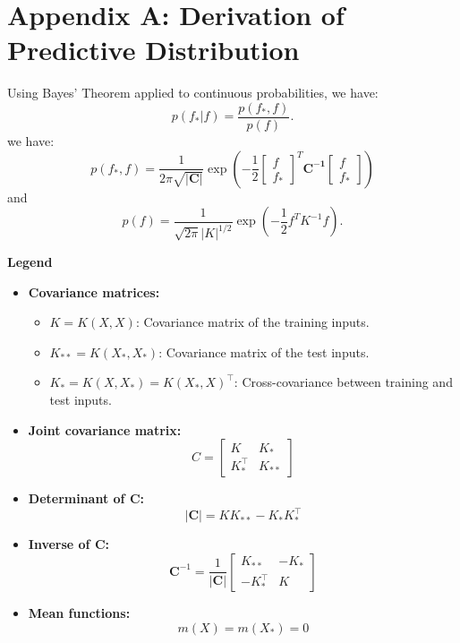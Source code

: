 \documentclass[12pt]{article}
\begin{document}
\appendix

\section{Appendix A: Derivation of Predictive Distribution}
\label{appendix:A}
Using Bayes' Theorem applied to continuous probabilities, we have:
\[
p(f_* | f) = \frac{p(f_*, f)}{p(f)}.
\]
we have:
$$p(f_*,f) = \frac{1}{2\pi\sqrt{\mathbf{|C|}}}\exp \left(-\frac{1}{2} 
\begin{bmatrix} f \\ f_*  \end{bmatrix}^T\mathbf{C^{-1}}\begin{bmatrix} f  \\ f_* \end{bmatrix}\right)$$
and 
\[
p(f) = \frac{1}{\sqrt{2\pi} |K|^{1/2}}
\exp \left(-\frac{1}{2} f^T K^{-1} f \right).
\]

\noindent
\textbf{Legend}
\begin{itemize}
    \item \textbf{Covariance matrices:}
    \begin{itemize}
        \item \( K = K(X, X) \): Covariance matrix of the training inputs.
        \item \( K_{**} = K(X_*, X_*) \): Covariance matrix of the test inputs.
        \item \( K_* = K(X, X_*) = K(X_*, X)^\top \): Cross-covariance between training and test inputs.
    \end{itemize}
    
    \item \textbf{Joint covariance matrix:}
    \[
    C = \begin{bmatrix}
    K & K_* \\
    K_*^\top & K_{**}
    \end{bmatrix}
    \]
    
    \item \textbf{Determinant of \( \mathbf{C} \):}
    \[
    |\mathbf{C}| = K K_{**} - K_* K_*^\top
    \]
    
    \item \textbf{Inverse of \( \mathbf{C} \):}
    \[
    \mathbf{C}^{-1} = \frac{1}{|\mathbf{C}|}
    \begin{bmatrix}
    K_{**} & -K_* \\
    -K_*^\top & K
    \end{bmatrix}
    \]
    
    \item \textbf{Mean functions:}
    \[
    m(X) = m(X_*) = 0
    \]
\end{itemize}
\end{document}
